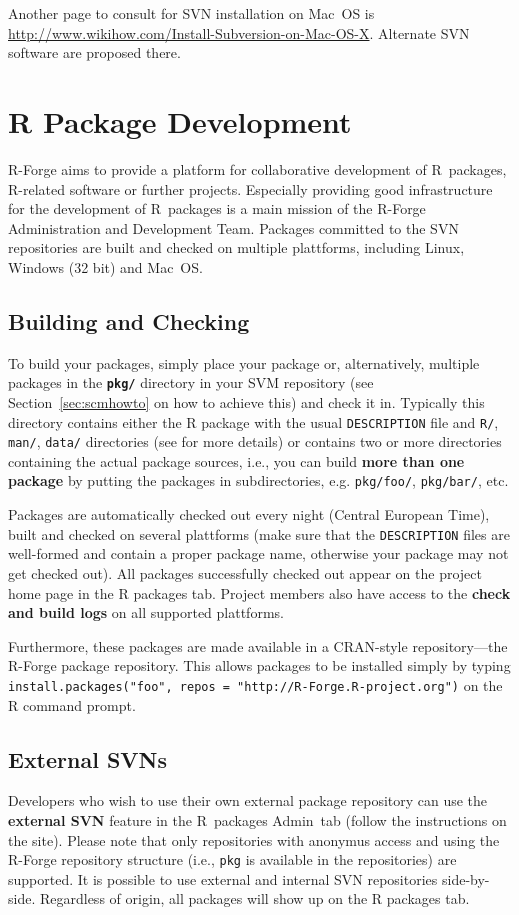 \documentclass[a4paper]{article}
\newcommand{\RFORGE}{R-Forge Administration and Development Team}
\newcommand{\proglang}[1]{\textsf{#1}}
\begin{document}
Another page to consult for SVN installation on Mac~OS is
\url{http://www.wikihow.com/Install-Subversion-on-Mac-OS-X}. Alternate SVN
software are proposed there. 

\section{R Package Development}

R-Forge aims to provide a platform for collaborative development of
\proglang{R}~packages, \proglang{R}-related software or further
projects. Especially providing good infrastructure for the development of
\proglang{R}~packages is a main mission of the \RFORGE{}. Packages
committed to the SVN repositories are built and checked on multiple
plattforms, including Linux, Windows (32 bit) and Mac~OS. 

\subsection{Building and Checking}
To build your packages, simply place your package or, alternatively,
multiple packages in the
\textbf{\texttt{pkg/}} directory in your SVM repository (see 
Section~\ref{sec:scmhowto} on how to achieve this) and check it
in. Typically this directory contains either the R package with the usual
\texttt{DESCRIPTION} file and \texttt{R/}, \texttt{man/},
\texttt{data/} directories (see \cite{Rcore:writing_R_extensions} for more
details) or contains two or more directories containing the actual
package sources, i.e., you can build \textbf{more than one package} by
putting the packages in subdirectories, e.g. \texttt{pkg/foo/}, 
\texttt{pkg/bar/}, etc.

Packages are automatically checked out every night (Central European
Time), built and checked on several plattforms (make sure that the
\texttt{DESCRIPTION} files are well-formed and contain a proper 
package name, otherwise your package may not get checked out). All
packages successfully checked out appear on the project home page in
the \proglang{R} packages tab. Project members also have access to the
\textbf{check and build logs} on all supported plattforms.  

Furthermore, these packages are made available in a CRAN-style
repository---the
R-Forge package repository. This allows packages to be installed simply by
typing \texttt{install.packages("foo", repos = "http://R-Forge.R-project.org")}
on the \proglang{R} command prompt. 

\subsection{External SVNs}
Developers who wish to use their own external package repository can
use the \textbf{external SVN} feature in the R~packages Admin~tab
(follow the instructions on the site). Please note that only
repositories with anonymus access and using the R-Forge repository
structure (i.e., \texttt{pkg} is available in the repositories) are
supported. It is possible to use 
external and internal SVN repositories side-by-side. Regardless of
origin, all packages will show up on the R packages tab.
\end{document}
